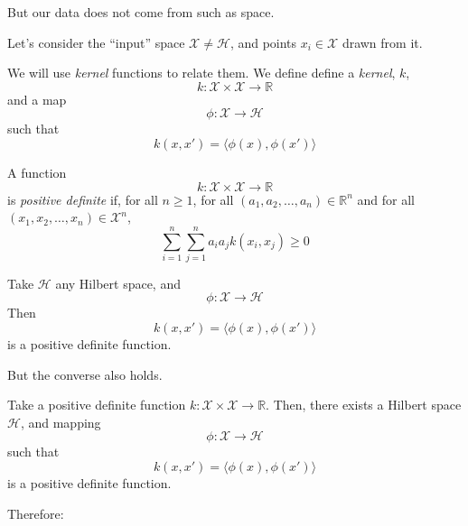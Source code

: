 But our data does not come from such as space.

Let's consider the ``input'' space $\mathcal{X}\ne\mathcal{H}$, and points $x_i \in \mathcal{X}$ drawn from it.

We will use \emph{kernel} functions to relate them.
\clearpage
We define define a \emph{kernel}, $k$,
\begin{equation*}
k : \mathcal{X} \times \mathcal{X} \rightarrow \mathbb{R}
\end{equation*}
and a map
\begin{equation}
\phi: \mathcal{X} \rightarrow \mathcal{H}
\end{equation}
such that 
\begin{equation*}
k(x, x') = \langle \phi(x), \phi(x') \rangle
\end{equation*}
\clearpage
\begin{defn}
A function 
\begin{equation*}
k:\mathcal{X} \times \mathcal{X}\rightarrow \mathbb{R}
\end{equation*}
 is \emph{positive definite} if,
for all $n \ge 1$,
for all $(a_1, a_2, \ldots, a_n) \in \mathbb{R}^n$ and
for all $(x_1, x_2, \ldots, x_n) \in \mathcal{X}^n$,
\begin{equation*}
\sum_{i=1}^n\sum_{j=1}^n a_i a_j k(x_i, x_j) \ge 0
\end{equation*}
\end{defn}
\clearpage
\begin{fact}
Take $\mathcal{H}$ any Hilbert space, and 
\begin{equation*}
\phi: \mathcal{X} \rightarrow \mathcal{H}
\end{equation*}
Then  
\begin{equation*}
k(x, x') = \langle \phi(x), \phi(x') \rangle
\end{equation*}
is a positive definite function.
\end{fact}
But the converse also holds.
\clearpage
\begin{fact}
Take a positive definite function $k : \mathcal{X} \times \mathcal{X} \rightarrow \mathbb{R}$.
Then, there exists a Hilbert space $\mathcal{H}$, and mapping
\begin{equation*}
\phi: \mathcal{X} \rightarrow \mathcal{H}
\end{equation*}
 such that
 \begin{equation*}
 k(x, x') = \langle \phi(x), \phi(x') \rangle
 \end{equation*}
is a positive definite function.
\end{fact}
\clearpage
Therefore:

